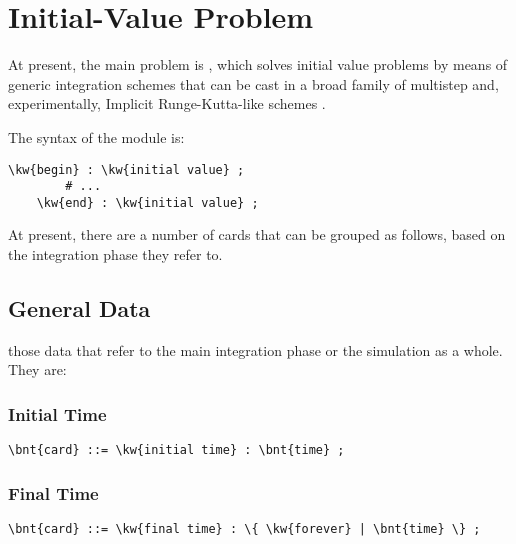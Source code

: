\section{Initial-Value Problem}
\label{sec:IVP}
At present, the main problem is ,
which solves initial value problems
by means of generic integration schemes that can be cast
in a broad family of multistep and, experimentally,
Implicit Runge-Kutta-like schemes
\cite{MASARATI-LANZ-MANTEGAZZA-2001}.

The syntax of the module is:
\begin{Verbatim}[commandchars=\\\{\}]
    \kw{begin} : \kw{initial value} ;
        # ...
    \kw{end} : \kw{initial value} ;
\end{Verbatim}
At present, there are a number of cards that can be grouped as follows, 
based on the integration phase they refer to.

\subsection{General Data}
those data that refer to the main integration phase or the simulation as a
whole. They are:

\subsubsection{Initial Time}
\begin{Verbatim}[commandchars=\\\{\}]
    \bnt{card} ::= \kw{initial time} : \bnt{time} ;
\end{Verbatim}

\subsubsection{Final Time}
\begin{Verbatim}[commandchars=\\\{\}]
    \bnt{card} ::= \kw{final time} : \{ \kw{forever} | \bnt{time} \} ;
\end{Verbatim}

